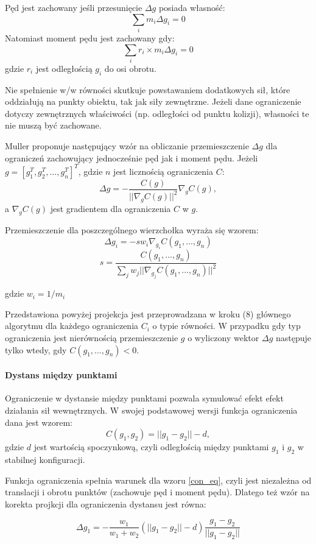 Pęd jest zachowany jeśli przesunięcie $\Delta g$ posiada własność:
$$ \sum_i m_i \Delta g_i = 0$$
Natomiast moment pędu jest zachowany gdy:
$$ \sum_i r_i \times m_i \Delta g_i = 0$$
gdzie $r_i$ jest odległością $g_i$ do osi
obrotu.

Nie spełnienie w/w równości skutkuje powstawaniem dodatkowych sił, które
oddziałują na punkty obiektu, tak jak siły zewnętrzne. Jeżeli dane ograniczenie
dotyczy zewnętrznych właściwości (np. odległości od punktu kolizji),
własności te nie muszą być zachowane\cite{pbdyn}.

Muller proponuje następujący wzór na obliczanie przemieszczenie $\Delta g$ dla
ograniczeń zachowujący jednocześnie pęd jak i moment pędu.
Jeżeli $g = [ g_1^T, g_2^T, ..., g_n^T]^T$, gdzie $n$ jest licznością
ograniczenia $C$:
\begin{equation} \label{con_eq}
\Delta g = - \frac{C(g)}{|| \nabla_g C(g) ||^2}\nabla_g C(g),
\end{equation}
a $\nabla_g C(g)$ jest gradientem dla ograniczenia $C$ w $g$.

Przemieszczenie dla poszczególnego wierzchołka wyraża się wzorem:
$$\Delta g_i = -s w_i\nabla_{g_i}C(g_1, ..., g_n)$$ 
$$ s = \frac{C(g_1, ..., g_n)}{\sum_j w_j|| \nabla_{g_j}C(g_1, ..., g_n)
	||^2}$$

gdzie $w_i = 1 / m_i$

Przedstawiona powyżej projekcja jest przeprowadzana w kroku (8) głównego
algorytmu dla każdego ograniczenia $C_i$ o typie równości.
W przypadku gdy typ ograniczenia jest nierównością przemieszczenie $g$
o wyliczony wektor $\Delta g$ następuje tylko wtedy, gdy $C(g_1, ...,
		g_n) < 0$.

\paragraph{Dystans między punktami}
Ograniczenie w dystansie między punktami pozwala symulować efekt efekt działania
sił wewnętrznych. W swojej podstawowej wersji funkcja ograniczenia dana jest wzorem:
$$ C(g_1, g_2) = || g_1 - g_2 || - d,$$ 
gdzie $d$ jest wartością
spoczynkową, czyli odległością między punktami $g_1$ i $g_2$ w stabilnej
konfiguracji.

Funkcja ograniczenia spełnia warunek dla wzoru \ref{con_eq}, czyli jest
niezależna od translacji i obrotu punktów (zachowuje pęd i moment pędu).
Dlatego też wzór na korekta projkcji dla
ograniczenia dystansu jest równa:

$$\Delta g_1 = - \frac{w_1}{w_1 + w_2} (|| g_1 - g_2 || - d)\frac{g_1 -
	g_2}{|| g_1 - g_2 ||}$$

